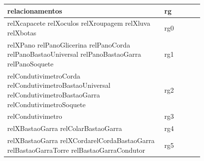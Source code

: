 \documentclass[12pt]{article}
\begin{document}
\begin{table}[H]
\begin{tabular}{|p{0.8\linewidth}|l|}
\hline
\textbf{relacionamentos}                                                                                                                                                                                                                                                                                                                  & \textbf{rg} \\ \hline
relXcapacete relXoculos relXroupagem relXluva relXbotas                                                                                                                                                                                                                                                                                   & rg0         \\ \hline
relXPano relPanoGlicerina relPanoCorda relPanoBastaoUniversal relPanoBastaoGarra relPanoSoquete                                                                                                                                                                                                                                           & rg1         \\ \hline
relCondutivimetroCorda relCondutivimetroBastaoUniversal relCondutivimetroBastaoGarra relCondutivimetroSoquete                                                                                                                                                                                                                                & rg2         \\ \hline
relCondutivimetro                                                                                                                                                                                                                                                                                                                         & rg3         \\ \hline
relXBastaoGarra relColarBastaoGarra                                                                                                                                                                                                                                                                                                        & rg4         \\ \hline
relXBastaoGarra relXCordarelCordaBastaoGarra relBastaoGarraTorre relBastaoGarraCondutor                                                                                                                                                                                                                                                      & rg5         \\ \hline

\end{tabular}
\end{table}
\end{document}
